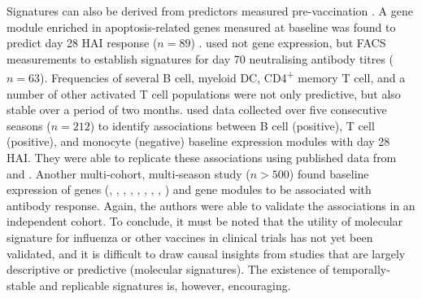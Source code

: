 Signatures can also be derived from predictors measured pre-vaccination \autocite{tsang2020ImprovingVaccineinducedImmunity}.
A gene module enriched in apoptosis-related genes measured at baseline was found to predict day 28 \gls{HAI} response ($n=89$) \autocite{furman2013ApoptosisOtherImmune}.
\textcite{tsang2014GlobalAnalysesHuman} used not gene expression, but \gls{FACS} measurements to establish signatures for day 70 neutralising antibody titres ($n=63$).
Frequencies of several B cell, myeloid \gls{DC}, CD4\textsuperscript{+} memory T cell, and a number of other activated T cell populations were not only predictive, but also stable over a period of two months. 
\textcite{nakaya2015SystemsAnalysisImmunity} used data collected over five consecutive seasons ($n=212$) to identify associations between B cell (positive), T cell (positive), and monocyte (negative) baseline expression modules with day 28 \gls{HAI}.
They were able to replicate these associations using published data from \textcite{franco2013IntegrativeGenomicAnalysis} and \textcite{furman2013ApoptosisOtherImmune}.
Another multi-cohort, multi-season study ($n > 500$) \autocite{hipc-chisignaturesprojectteam2017MulticohortAnalysisReveals} found baseline expression of genes (, , , , , , , , ) and gene modules to be associated with antibody response.
Again, the authors were able to validate the associations in an independent cohort.
To conclude, it must be noted that the utility of molecular signature for influenza or other vaccines in clinical trials has not yet been validated,
and it is difficult to draw causal insights from studies that are largely descriptive or predictive (molecular signatures).
The existence of temporally-stable and replicable signatures is, however, encouraging.

%

